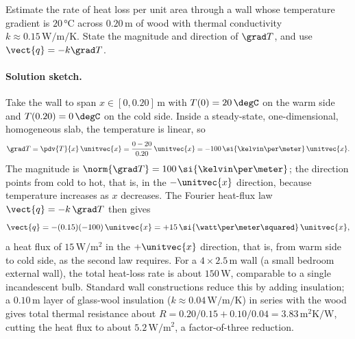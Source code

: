 \begin{exercise}
Estimate the rate of heat loss per unit area through a wall whose
temperature gradient is $20\,\si{\degreeCelsius}$ across
$0.20\,\si{\meter}$ of wood with thermal conductivity $k \approx
0.15\,\si{\watt\per\meter\per\kelvin}$. State the magnitude and
direction of $\grad T$, and use $\vect{q} = -k \grad T$.

\paragraph{Solution sketch.} Take the wall to span $x \in [0,
0.20]\,\si{\meter}$ with $T(0) = 20\,\degC$ on the warm side and
$T(0.20) = 0\,\degC$ on the cold side. Inside a steady-state,
one-dimensional, homogeneous slab, the temperature is linear, so
\[
\grad T = \pdv{T}{x}\,\unitvec{x} =
\frac{0 - 20}{0.20}\,\unitvec{x} = -100\,\si{\kelvin\per\meter}\,
\unitvec{x}.
\]
The magnitude is $\norm{\grad T} = 100\,\si{\kelvin\per\meter}$; the
direction points from cold to hot, that is, in the $-\unitvec{x}$
direction, because temperature increases as $x$ decreases. The
Fourier heat-flux law $\vect{q} = -k\,\grad T$ then gives
\[
\vect{q} = -(0.15)(-100)\,\unitvec{x} = +15\,\si{\watt\per\meter
\squared}\,\unitvec{x},
\]
a heat flux of $15\,\si{\watt\per\meter\squared}$ in the
$+\unitvec{x}$ direction, that is, from warm side to cold side, as
the second law requires. For a $4 \times 2.5\,\si{\meter}$ wall
(a small bedroom external wall), the total heat-loss rate is about
$150\,\si{\watt}$, comparable to a single incandescent bulb.
Standard wall constructions reduce this by adding insulation; a
$0.10\,\si{\meter}$ layer of glass-wool insulation ($k \approx
0.04\,\si{\watt\per\meter\per\kelvin}$) in series with the wood
gives total thermal resistance about $R = 0.20/0.15 + 0.10/0.04 =
3.83\,\si{\meter\squared\kelvin\per\watt}$, cutting the heat flux
to about $5.2\,\si{\watt\per\meter\squared}$, a factor-of-three
reduction.
\end{exercise}

